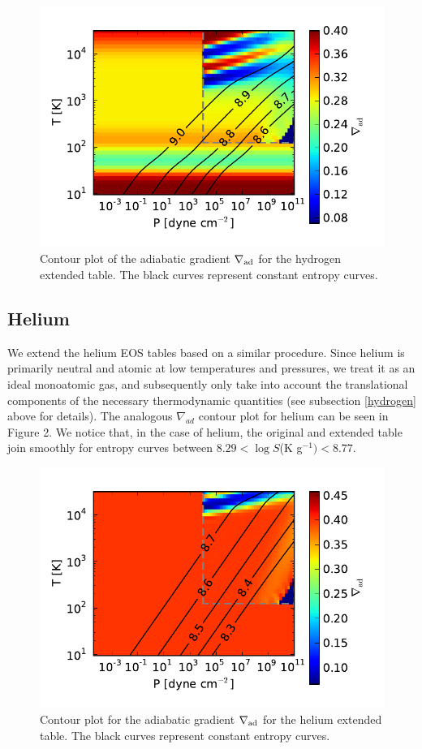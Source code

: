 \documentclass[apj]{emulateapj}
\newcommand{\delad}{\nabla_{\rm ad}}
\begin{document}
\begin{figure}[h!]
\centering
\includegraphics[scale=.8]{../../figs/EOS/delad_S_H.pdf}
\caption{Contour plot of the adiabatic gradient $\delad$ for the hydrogen extended table. The black curves represent constant entropy curves.}
\end{figure}

\subsection{Helium}

We extend the helium EOS tables based on a similar procedure. Since helium is primarily neutral and atomic at low temperatures and pressures, we treat it as an ideal monoatomic gas, and subsequently only take into account the translational components of the necessary thermodynamic quantities (see subsection \ref{hydrogen} above for details). The analogous $\nabla_{ad}$ contour plot for helium can be seen in Figure 2. We notice that, in the case of helium, the original and extended table join smoothly for entropy curves between $8.29<\log{S}$(K g$^{-1})<8.77$.

\begin{figure}[h!]
\centering
\includegraphics[scale=.8]{../../figs/EOS/delad_S_He.pdf}
\caption{Contour plot for the adiabatic gradient $\delad$ for the helium extended table. The black curves represent constant entropy curves.}
\end{figure}
\end{document}
